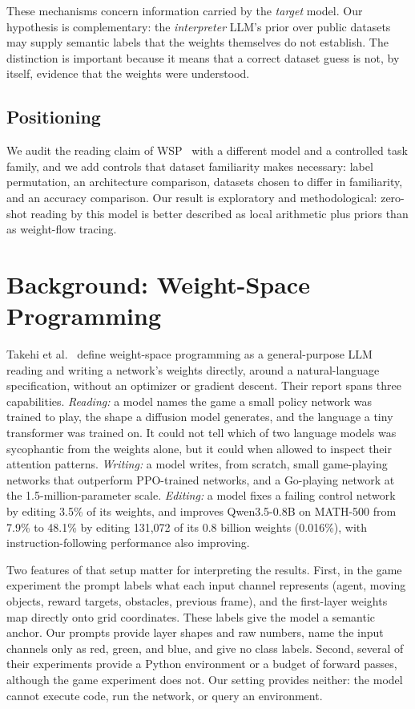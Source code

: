 \documentclass[11pt]{article}
\begin{document}
These mechanisms concern information carried by the \emph{target} model. Our hypothesis is complementary: the \emph{interpreter} LLM's prior over public datasets may supply semantic labels that the weights themselves do not establish. The distinction is important because it means that a correct dataset guess is not, by itself, evidence that the weights were understood.

\subsection{Positioning}

We audit the reading claim of WSP~\cite{takehi} with a different model and a controlled task family, and we add controls that dataset familiarity makes necessary: label permutation, an architecture comparison, datasets chosen to differ in familiarity, and an accuracy comparison. Our result is exploratory and methodological: zero-shot reading by this model is better described as local arithmetic plus priors than as weight-flow tracing.

\section{Background: Weight-Space Programming}

Takehi et al.~\cite{takehi} define weight-space programming as a general-purpose LLM reading and writing a network's weights directly, around a natural-language specification, without an optimizer or gradient descent. Their report spans three capabilities. \emph{Reading:} a model names the game a small policy network was trained to play, the shape a diffusion model generates, and the language a tiny transformer was trained on. It could not tell which of two language models was sycophantic from the weights alone, but it could when allowed to inspect their attention patterns. \emph{Writing:} a model writes, from scratch, small game-playing networks that outperform PPO-trained networks, and a Go-playing network at the 1.5-million-parameter scale. \emph{Editing:} a model fixes a failing control network by editing 3.5\% of its weights, and improves Qwen3.5-0.8B on \mbox{MATH-500} from 7.9\% to 48.1\% by editing 131,072 of its 0.8 billion weights (0.016\%), with instruction-following performance also improving.

Two features of that setup matter for interpreting the results. First, in the game experiment the prompt labels what each input channel represents (agent, moving objects, reward targets, obstacles, previous frame), and the first-layer weights map directly onto grid coordinates. These labels give the model a semantic anchor. Our prompts provide layer shapes and raw numbers, name the input channels only as red, green, and blue, and give no class labels. Second, several of their experiments provide a Python environment or a budget of forward passes, although the game experiment does not. Our setting provides neither: the model cannot execute code, run the network, or query an environment.
\end{document}
